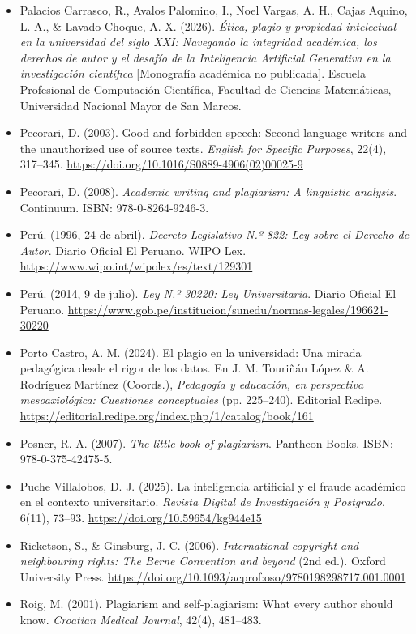 \begin{itemize}[leftmargin=1.5em, label={}, itemsep=0.22ex, parsep=0pt]
\item Palacios Carrasco, R., Avalos Palomino, I., Noel Vargas, A. H., Cajas Aquino, L. A., \& Lavado Choque, A. X. (2026). \textit{Ética, plagio y propiedad intelectual en la universidad del siglo XXI: Navegando la integridad académica, los derechos de autor y el desafío de la Inteligencia Artificial Generativa en la investigación científica} [Monografía académica no publicada]. Escuela Profesional de Computación Científica, Facultad de Ciencias Matemáticas, Universidad Nacional Mayor de San Marcos.
\item Pecorari, D. (2003). Good and forbidden speech: Second language writers and the unauthorized use of source texts. \textit{English for Specific Purposes}, 22(4), 317--345. \url{https://doi.org/10.1016/S0889-4906(02)00025-9}
\item Pecorari, D. (2008). \textit{Academic writing and plagiarism: A linguistic analysis}. Continuum. ISBN: 978-0-8264-9246-3.
\item Perú. (1996, 24 de abril). \textit{Decreto Legislativo N.º 822: Ley sobre el Derecho de Autor}. Diario Oficial El Peruano. WIPO Lex. \url{https://www.wipo.int/wipolex/es/text/129301}
\item Perú. (2014, 9 de julio). \textit{Ley N.º 30220: Ley Universitaria}. Diario Oficial El Peruano. \url{https://www.gob.pe/institucion/sunedu/normas-legales/196621-30220}
\item Porto Castro, A. M. (2024). El plagio en la universidad: Una mirada pedagógica desde el rigor de los datos. En J. M. Touriñán López \& A. Rodríguez Martínez (Coords.), \textit{Pedagogía y educación, en perspectiva mesoaxiológica: Cuestiones conceptuales} (pp. 225--240). Editorial Redipe. \url{https://editorial.redipe.org/index.php/1/catalog/book/161}
\item Posner, R. A. (2007). \textit{The little book of plagiarism}. Pantheon Books. ISBN: 978-0-375-42475-5.
\item Puche Villalobos, D. J. (2025). La inteligencia artificial y el fraude académico en el contexto universitario. \textit{Revista Digital de Investigación y Postgrado}, 6(11), 73--93. \url{https://doi.org/10.59654/kg944e15}
\item Ricketson, S., \& Ginsburg, J. C. (2006). \textit{International copyright and neighbouring rights: The Berne Convention and beyond} (2nd ed.). Oxford University Press. \url{https://doi.org/10.1093/acprof:oso/9780198298717.001.0001}
\item Roig, M. (2001). Plagiarism and self-plagiarism: What every author should know. \textit{Croatian Medical Journal}, 42(4), 481--483.

\end{itemize}

